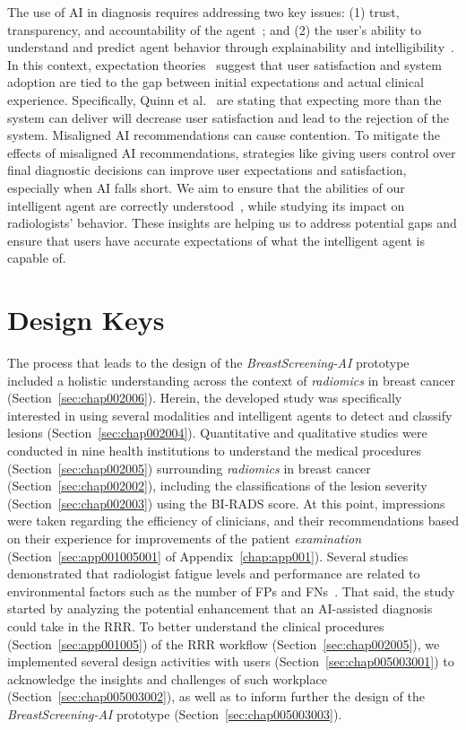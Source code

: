 The use of \ac{AI} in diagnosis requires addressing two key issues:
(1) trust, transparency, and accountability of the agent~\cite{10.1145/3290605.3300233}; and
(2) the user's ability to understand and predict agent behavior through explainability and intelligibility~\cite{gunning2017explainable}.
In this context, expectation theories~\cite{Kocielnik:2019:YAI:3290605.3300641} suggest that user satisfaction and system adoption are tied to the gap between initial expectations and actual clinical experience.
Specifically, Quinn et al.~\cite{QUINN2022102158} are stating that expecting more than the system can deliver will decrease user satisfaction and lead to the rejection of the system.
Misaligned \ac{AI} recommendations can cause contention.
To mitigate the effects of misaligned \ac{AI} recommendations, strategies like giving users control over final diagnostic decisions can improve user expectations and satisfaction, especially when \ac{AI} falls short.
We aim to ensure that the abilities of our intelligent agent are correctly understood~\cite{CALISTO2021102607}, while studying its impact on radiologists' behavior.
These insights are helping us to address potential gaps and ensure that users have accurate expectations of what the intelligent agent is capable of.

\section{Design Keys}
\label{sec:chap005003}

The process that leads to the design of the {\it BreastScreening-AI} prototype~\cite{CALISTO2022102285} included a holistic understanding across the context of {\it radiomics} in breast cancer (Section~\ref{sec:chap002006}).
Herein, the developed study was specifically interested in using several modalities and intelligent agents to detect and classify lesions (Section~\ref{sec:chap002004}).
Quantitative and qualitative studies were conducted in nine health institutions to understand the medical procedures (Section~\ref{sec:chap002005}) surrounding {\it radiomics} in breast cancer (Section~\ref{sec:chap002002}), including the classifications of the lesion severity (Section~\ref{sec:chap002003}) using the \ac{BI-RADS} score.
At this point, impressions were taken regarding the efficiency of clinicians, and their recommendations based on their experience for improvements of the patient {\it examination} (Section~\ref{sec:app001005001} of Appendix~\ref{chap:app001}).
Several studies demonstrated that radiologist fatigue levels and performance are related to environmental factors such as the number of \acp{FP} and \acp{FN}~\cite{waite2017tired}.
That said, the study started by analyzing the potential enhancement that an \ac{AI}-assisted diagnosis could take in the \ac{RRR}.
To better understand the clinical procedures (Section~\ref{sec:app001005}) of the \ac{RRR} workflow (Section~\ref{sec:chap002005}), we implemented several design activities with users (Section~\ref{sec:chap005003001}) to acknowledge the insights and challenges of such workplace (Section~\ref{sec:chap005003002}), as well as to inform further the design of the {\it BreastScreening-AI} prototype (Section~\ref{sec:chap005003003}).

